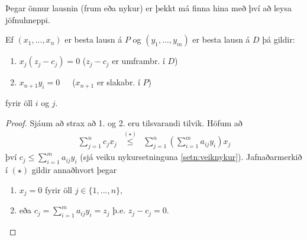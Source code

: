 Þegar önnur lausnin (frum eða nykur) er þekkt má finna hina með því að leysa jöfnuhneppi.

\begin{setn} Ef $(x_1,...,x_n)$ er besta lausn á $P$ og $(y_1,...,y_m)$ er besta lausn á $D$ þá gildir:
\begin{enumerate}
 \item $x_j(z_j-c_j)=0$ \quad\quad ($z_j-c_j$ er umframbr. í $D$)
 \item $x_{n+1}y_i=0$\quad\quad\quad~~~($x_{n+1}$ er slakabr. í $P$)
\end{enumerate}
fyrir öll $i$ og $j$.
\end{setn}
\begin{proof}Sjáum að strax að 1. og 2. eru tilsvarandi tilvik. 
Höfum að 
\begin{eqnarray*}
\sum_{j=1}^n c_jx_j &\stackrel{(\star)}{\leq}& \sum_{j=1}^n\left(\sum_{i=1}^m a_{ij}y_i\right)x_j
\end{eqnarray*}
því $c_j\leq\sum_{i=1}^m a_{ij}y_i$ (sjá veiku nykursetninguna \ref{setn:veiknykur}).
Jafnaðarmerkið í $(\star)$ gildir annaðhvort þegar
\begin{enumerate}[label=(\roman{*})]
 \item $x_j=0$ fyrir öll $j\in\{1,...,n\}$,
 \item eða $c_j=\sum_{i=1}^m a_{ij}y_i=z_j$ þ.e. $z_j-c_j=0$.
\end{enumerate}
\end{proof}

